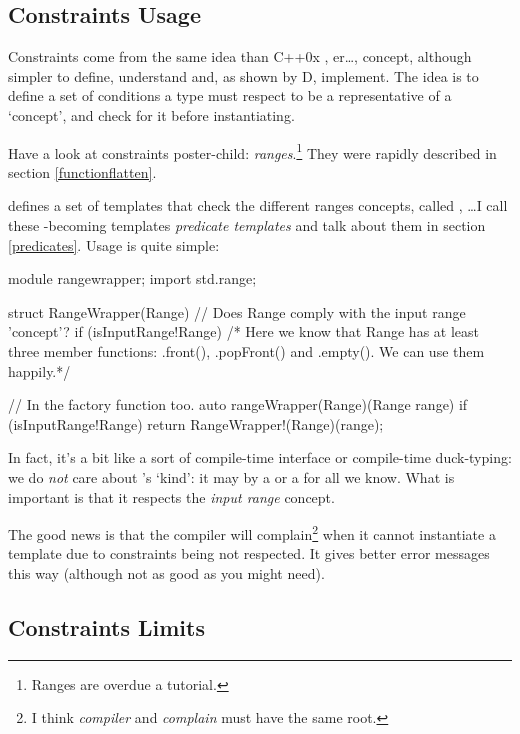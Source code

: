 \subsection{Constraints Usage}\label{constraintsusage}

Constraints come from the same idea than C++0x , er\ldots, concept, although simpler to define, understand and, as shown by D, implement. The idea is to define a set of conditions a type must respect to be a representative of a `concept', and check for it before instantiating.

Have a look at constraints poster-child: \emph{ranges}.\footnote{ Ranges are overdue a tutorial.} They were rapidly described in section \ref{functionflatten}.

 defines a set of templates that check the different ranges concepts, called , \ldots I call these -becoming templates \emph{predicate templates} and talk about them in section \ref{predicates}. Usage is quite simple:

\begin{dcode}
module rangewrapper;
import std.range;

struct RangeWrapper(Range) 
    // Does Range comply with the input range 'concept'?
    if (isInputRange!Range) 
{ 
   /* Here we know that Range has at least three member functions:
      .front(), .popFront() and .empty(). We can use them happily.*/
}

// In the factory function too.
auto rangeWrapper(Range)(Range range) if (isInputRange!Range) 
{
    return RangeWrapper!(Range)(range);
}
\end{dcode}

In fact, it's a bit like a sort of compile-time interface or compile-time duck-typing: we do \emph{not} care about 's `kind': it may by a  or a  for all we know. What is important is that it respects the \emph{input range} concept.

The good news is that the compiler will complain\footnote{ I think \emph{compiler} and \emph{complain} must have the same root.} when it cannot instantiate a template due to constraints being not respected. It gives better error messages this way (although not as good as you might need).

\subsection{Constraints Limits}\label{constraintslimits}


